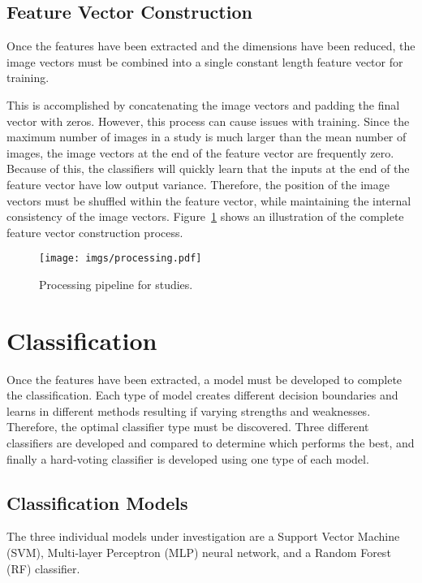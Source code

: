 \documentclass{IEEEtran}
\begin{document}
	\subsection{Feature Vector Construction}
	
	Once the features have been extracted and the dimensions have been reduced, the image vectors must be combined into a single constant length feature vector for training. 
	
	This is accomplished by concatenating the image vectors and padding the final vector with zeros. However, this process can cause issues with training. Since the maximum number of images in a study is much larger than the mean number of images, the image vectors at the end of the feature vector are frequently zero. Because of this, the classifiers will quickly learn that the inputs at the end of the feature vector have low output variance. Therefore, the position of the image vectors must be shuffled within the feature vector, while maintaining the internal consistency of the image vectors. Figure~\ref{fig:shuffle} shows an illustration of the complete feature vector construction process.
	
	\begin{figure}[t!]
		\centering
		\texttt{[image: imgs/processing.pdf]}
		\caption{Processing pipeline for studies.}
		\label{fig:shuffle}
	\end{figure}
	
	\section{Classification} \label{sec:classifiers}
	
	Once the features have been extracted, a model must be developed to complete the classification. Each type of model creates different decision boundaries and learns in different methods resulting if varying strengths and weaknesses. Therefore, the optimal classifier type must be discovered. Three different classifiers are developed and compared to determine which performs the best, and finally a hard-voting classifier is developed using one type of each model.
	
	\subsection{Classification Models}
	
	The three individual models under investigation are a Support Vector Machine (SVM), Multi-layer Perceptron (MLP) neural network, and a Random Forest (RF) classifier. 
	
\end{document}
